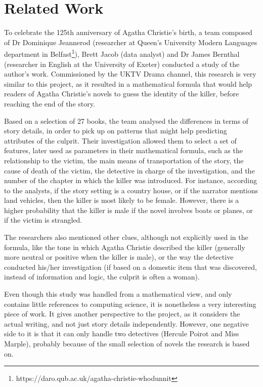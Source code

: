 \documentclass{mproj}
\begin{document}
\section{Related Work}

To celebrate the 125th anniversary of Agatha Christie's birth, a team composed of Dr Dominique Jeannerod (researcher at Queen's University Modern Languages department in Belfast\footnote{https://daro.qub.ac.uk/agatha-christie-whodunnit}), Brett Jacob (data analyst) and Dr James Bernthal (researcher in English at the University of Exeter) conducted a study of the author's work. \cite{whodunnitguardian}
Commissioned by the UKTV Drama channel, this research is very similar to this project, as it resulted in a mathematical formula that would help readers of Agatha Christie's novels to guess the identity of the killer, before reaching the end of the story. \par

Based on a selection of 27 books, the team analysed the differences in terms of story details, in order to pick up on patterns that might help predicting attributes of the culprit. Their investigation allowed them to select a set of features, later used as parameters in their mathematical formula, such as the relationship to the victim, the main means of transportation of the story, the cause of death of the victim, the detective in charge of the investigation, and the number of the chapter in which the killer was introduced. For instance, according to the analysts, if the story setting is a country house, or if the narrator mentions land vehicles, then the killer is most likely to be female. However, there is a higher probability that the killer is male if the novel involves boats or planes, or if the victim is strangled. \par

The researchers also mentioned other clues, although not explicitly used in the formula, like the tone in which Agatha Christie described the killer (generally more neutral or positive when the killer is male), or the way the detective conducted his/her investigation (if based on a domestic item that was discovered, instead of information and logic, the culprit is often a woman).  \par

Even though this study was handled from a mathematical view, and only contains little references to computing science, it is nonetheless a very interesting piece of work. It gives another perspective to the project, as it considers the actual writing, and not just story details independently. However, one negative side to it is that it can only handle two detectives (Hercule Poirot and Miss Marple), probably because of the small selection of novels the research is based on.
\end{document}
